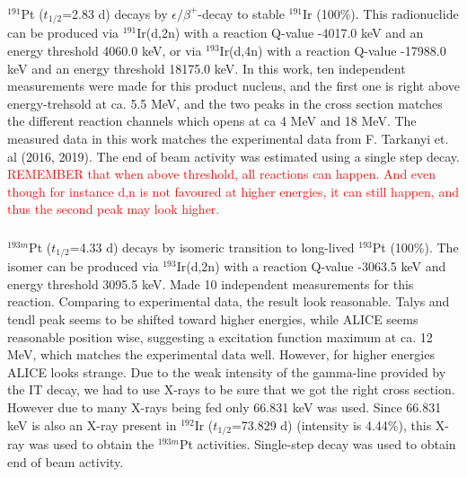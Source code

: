 \documentclass[a4paper,11pt,twoside]{book}
\begin{document}
\subsubsection{}
$^{191}$Pt ($t_{1/2}$=2.83 d) decays by $\epsilon/\beta^+$-decay to stable $^{191}$Ir (100\%). This radionuclide can be produced via $^{191}$Ir(d,2n) with a reaction Q-value -4017.0 keV and an energy threshold 4060.0 keV, or via $^{193}$Ir(d,4n) with a reaction Q-value -17988.0 keV and an energy threshold 18175.0 keV. In this work, ten independent measurements were made for this product nucleus, and the first one is right above energy-trehsold at ca. 5.5 MeV, and the two peaks in the cross section matches the different reaction channels which opens at ca 4 MeV and 18 MeV. The measured data in this work matches the experimental data from F. Tarkanyi et. al (2016, 2019). The end of beam activity was estimated using a single step decay. 
\textcolor{red}{REMEMBER that when above threshold, all reactions can happen. And even though for instance d,n is not favoured at higher energies, it can still happen, and thus the second peak may look higher.  }

\subsubsection{}
$^{193m}$Pt ($t_{1/2}$=4.33 d) decays by isomeric transition to long-lived $^{193}$Pt (100\%). The isomer can be produced via $^{193}$Ir(d,2n) with a reaction Q-value -3063.5 keV and energy threshold 3095.5 keV. Made 10 independent measurements for this reaction. Comparing to experimental data, the result look reasonable. Talys and tendl peak seems to be shifted toward higher energies, while ALICE seems reasonable position wise, suggesting a excitation function maximum at ca. 12 MeV, which matches the experimental data well. However, for higher energies ALICE looks strange. Due to the weak intensity of the gamma-line provided by the IT decay, we had to use X-rays to be sure that we got the right cross section. However due to many X-rays being fed only 66.831 keV was used. Since 66.831 keV is also an X-ray present in $^{192}$Ir ($t_{1/2}$=73.829 d) (intensity is 4.44\%), this X-ray was used to obtain the $^{193m}$Pt activities. Single-step decay was used to obtain end of beam activity. 
\end{document}
